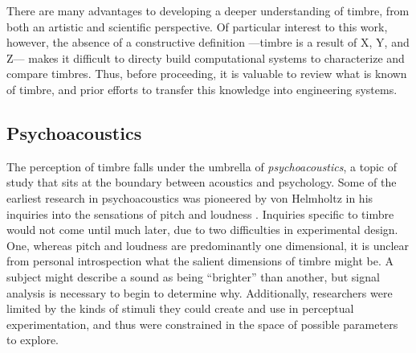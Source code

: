 There are many advantages to developing a deeper understanding of timbre, from both an artistic and scientific perspective.
Of particular interest to this work, however, the absence of a constructive definition ---timbre is a result of X, Y, and Z--- makes it difficult to directy build computational systems to characterize and compare timbres.
Thus, before proceeding, it is valuable to review what is known of timbre, and prior efforts to transfer this knowledge into engineering systems.


\subsection{Psychoacoustics}
The perception of timbre falls under the umbrella of \emph{psychoacoustics}, a topic of study that sits at the boundary between acoustics and psychology.
Some of the earliest research in psychoacoustics was pioneered by von Helmholtz in his inquiries into the sensations of pitch and loudness \cite{Cook1995?}.
Inquiries specific to timbre would not come until much later, due to two difficulties in experimental design.
One, whereas pitch and loudness are predominantly one dimensional, it is unclear from personal introspection what the salient dimensions of timbre might be.
A subject might describe a sound as being ``brighter'' than another, but signal analysis is necessary to begin to determine why.
Additionally, researchers were limited by the kinds of stimuli they could create and use in perceptual experimentation, and thus were constrained in the space of possible parameters to explore.

